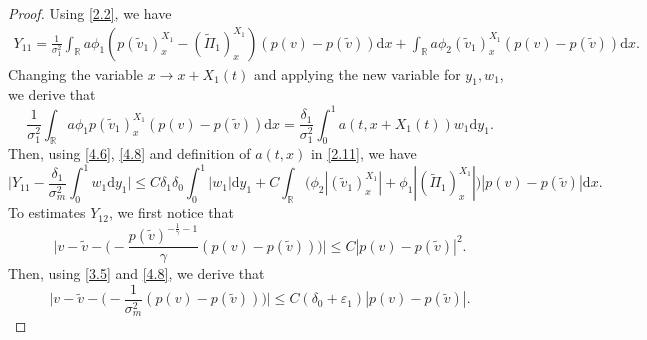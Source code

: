 \documentclass[10pt,reqno]{amsart}
\numberwithin{equation}{section}
\newcommand{\dif}{\mathrm{d}}
\begin{document}
\begin{proof}
Using \eqref{2.2}, we have
\begin{align*}
Y_{11}=\frac{1}{\sigma_1^2}\int_\mathbb{R}a\phi_1\left(p(\widetilde{v}_1)^{X_1}_x-(\widetilde{\Pi}_1)^{X_1}_x\right)
(p(v)-p(\widetilde{v}))\dif x
+\int_\mathbb{R}a\phi_2(\widetilde{v}_1)^{X_1}_x(p(v)-p(\widetilde{v}))\dif x.
\end{align*}
Changing the variable $x\rightarrow x+X_1(t)$ and applying the new variable for $y_1,w_1$, we derive that
\[
\frac{1}{\sigma_1^2}\int_\mathbb{R}a\phi_1p(\widetilde{v}_1)^{X_1}_x(p(v)-p(\widetilde{v}))\dif x
=\frac{\delta_1}{\sigma_1^2}\int_0^1a(t,x+X_1(t))w_1\dif y_1.
\]
Then, using \eqref{4.6}, \eqref{4.8} and definition of $a(t,x)$ in \eqref{2.11}, we have
\[
\Big|Y_{11}-\frac{\delta_1}{\sigma_m^2}\int_0^1w_1\dif y_1\Big|\le C\delta_1\delta_0\int_0^1|w_1|\dif y_1
+C\int_\mathbb{R}\Big(\phi_2|(\widetilde{v}_1)^{X_1}_x|+\phi_1|(\widetilde{\Pi}_1)^{X_1}_x|\Big)|p(v)-p(\widetilde{v})|\dif x.
\]
To estimates $Y_{12}$, we first notice that
\[
\Big|v-\widetilde{v}-\Big(-\frac{p(\widetilde{v})^{-\frac{1}{\gamma}-1}}{\gamma}(p(v)-p(\widetilde{v}))\Big)\Big|\le C|p(v)-p(\widetilde{v})|^2.
\]
Then, using \eqref{3.5} and \eqref{4.8}, we derive that
\[
\Big|v-\widetilde{v}-\Big(-\frac{1}{\sigma_m^2}(p(v)-p(\widetilde{v}))\Big)\Big|\le C(\delta_0+\varepsilon_1)|p(v)-p(\widetilde{v})|.
\]


\end{proof}
\end{document}
